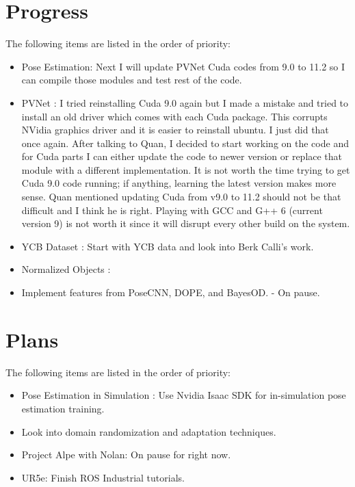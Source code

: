 \documentclass[11pt]{article}
\begin{document}
\section{Progress}
The following items are listed in the order of priority:
\begin{itemize}
      \item Pose Estimation: Next I will update PVNet Cuda codes from 9.0 to 11.2
      so I can compile those modules and test rest of the code.

      \item PVNet \cite{peng2019pvnet}: I tried reinstalling Cuda 9.0 again but
      I made a mistake and tried to install an old driver which comes with each
      Cuda package. This corrupts NVidia graphics driver and it is easier to
      reinstall ubuntu. I just did that once again. After talking to Quan, I decided to start working on the code
      and for Cuda parts I can either update the code to newer version or replace
      that module with a different implementation. It is not worth the time
      trying to get Cuda 9.0 code running; if anything, learning the latest
      version makes more sense. Quan mentioned updating Cuda from v9.0 to 11.2
      should not be that difficult and I think he is right. Playing with GCC and
      G++ 6 (current version 9) is not worth it since it will disrupt every other
      build on the system.

      \item YCB Dataset \cite{calli2015ycb}: Start with YCB data and look into
      Berk Calli's work.

      \item Normalized Objects \cite{Wang_2019_CVPR}:
      \item Implement features from PoseCNN, DOPE, and BayesOD. - On pause.
\end{itemize}


\section{Plans}
The following items are listed in the order of priority:

\begin{itemize}
      \item Pose Estimation in Simulation \cite{NVIDIAIs75:online}: Use Nvidia
      Isaac SDK for in-simulation pose estimation training.
      \item Look into domain randomization and adaptation techniques.
      \item Project Alpe with Nolan: On pause for right now.
      \item UR5e: Finish ROS Industrial tutorials.
\end{itemize}
\end{document}
